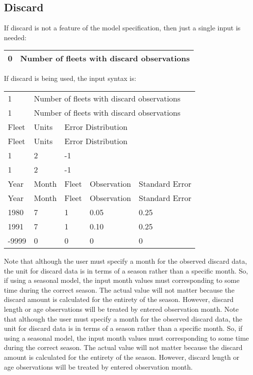 \subsection{Discard}
If discard is not a feature of the model specification, then just a single input is needed:

\begin{center}
\begin{tabular}{p{2cm} p{13cm}}
	\hline
	0 & Number of fleets with discard observations \Tstrut\Bstrut\\
	\hline
\end{tabular}
\end{center}
	
	
If discard is being used, the input syntax is:
\begin{center}
	\begin{tabular}{p{2cm} p{3cm} p{3cm} p{3cm} p{3cm}}
		\hline
		1 & \multicolumn{4}{l}{Number of fleets with discard observations} \Tstrut\Bstrut\\
		1 & \multicolumn{4}{l}{Number of fleets with discard observations} \Tstrut\Bstrut\\
		\hline
		Fleet & Units & \multicolumn{3}{l}{Error Distribution} \Tstrut\Bstrut\\
		Fleet & Units & \multicolumn{3}{l}{Error Distribution} \Tstrut\Bstrut\\
		\hline
		1 & 2 & \multicolumn{3}{l}{-1} \Tstrut\Bstrut\\
		1 & 2 & \multicolumn{3}{l}{-1} \Tstrut\Bstrut\\
		\hline
		Year & Month & Fleet & Observation & Standard Error \Tstrut\Bstrut\\
		Year & Month & Fleet & Observation & Standard Error \Tstrut\Bstrut\\
		\hline
		1980  & 7 & 1 & 0.05 & 0.25 \Tstrut\\
		1991  & 7 & 1 & 0.10 & 0.25 \\
		-9999 & 0 & 0 &    0 & 0 \Bstrut\\
		\hline
	\end{tabular}
\end{center}

Note that although the user must specify a month for the observed discard data, the unit for discard data is in terms of a season rather than a specific month. So, if using a seasonal model, the input month values must corresponding to some time during the correct season. The actual value will not matter because the discard amount is calculated for the entirety of the season. However, discard length or age observations will be treated by entered observation month.
Note that although the user must specify a month for the observed discard data, the unit for discard data is in terms of a season rather than a specific month. So, if using a seasonal model, the input month values must corresponding to some time during the correct season. The actual value will not matter because the discard amount is calculated for the entirety of the season. However, discard length or age observations will be treated by entered observation month.
	
